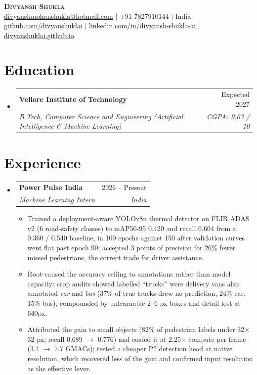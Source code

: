 \documentclass[letterpaper,11pt]{article}
\makeatletter
\newcommand{\graddate}{Expected 2027}
\newcommand{\introle}{Machine Learning Intern}
\newcommand{\intdates}{2026 -- Present}
\newcommand{\resumeItem}[1]{
  \item\small{
    {#1 \vspace{-2pt}}
  }
}
\newcommand{\resumeSubheading}[4]{
  \vspace{-2pt}\item
    \begin{tabular*}{0.97\textwidth}[t]{l@{\extracolsep{\fill}}r}
      \textbf{#1} & #2 \\
      \textit{\small#3} & \textit{\small #4} \\
    \end{tabular*}\vspace{-8pt}
}
\newcommand{\resumeSubHeadingListStart}{\begin{itemize}[leftmargin=0.15in, label={}, itemsep=0pt]}
\newcommand{\resumeSubHeadingListEnd}{\end{itemize}\vspace{-8pt}}
\newcommand{\resumeItemListStart}{\begin{itemize}[itemsep=-2.2pt]}
\newcommand{\resumeItemListEnd}{\end{itemize}\vspace{-6pt}}
\makeatother
\begin{document}
\begin{center}
    \textbf{\Huge \scshape Divyansh Shukla} \\ \vspace{2pt}
    \small
    \href{mailto:divyanshmohanshukla@hotmail.com}{\uline{divyanshmohanshukla@hotmail.com}} $|$
    +91 7827910144 $|$
    India \\ \vspace{1pt}
    \href{https://github.com/divyanshuklai}{\uline{github.com/divyanshuklai}} $|$
    \href{https://www.linkedin.com/in/divyansh-shukla-ai/}{\uline{linkedin.com/in/divyansh-shukla-ai}} $|$
    \href{https://divyanshuklai.github.io}{\uline{divyanshuklai.github.io}}
\end{center}

\section{Education}
  \resumeSubHeadingListStart
    \resumeSubheading
      {Vellore Institute of Technology}{\graddate}
      {B.Tech, Computer Science and Engineering (Artificial Intelligence \& Machine Learning)}{CGPA: 9.03 / 10}
  \resumeSubHeadingListEnd

\section{Experience}
  \resumeSubHeadingListStart
    \resumeSubheading
      {Power Pulse India}{\intdates}
      {\introle}{India}
      \resumeItemListStart
        \resumeItem{Trained a deployment-aware YOLOv8n thermal detector on FLIR ADAS v2 (6 road-safety classes) to mAP50-95 0.420 and recall 0.604 from a 0.360 / 0.540 baseline, in 100 epochs against 150 after validation curves went flat past epoch 90; accepted 3 points of precision for 26\% fewer missed pedestrians, the correct trade for driver assistance.}
        \resumeItem{Root-caused the accuracy ceiling to annotations rather than model capacity: crop audits showed labelled ``trucks'' were delivery vans also annotated \textit{car} and \textit{bus} (37\% of true trucks drew no prediction, 24\% car, 15\% bus), compounded by unlearnable 2--6 px boxes and detail lost at 640px.}
        \resumeItem{Attributed the gain to small objects (82\% of pedestrian labels under 32$\times$32 px; recall 0.689 $\rightarrow$ 0.776) and costed it at 2.25$\times$ compute per frame (3.4 $\rightarrow$ 7.7 GMACs); tested a cheaper P2 detection head at native resolution, which recovered less of the gain and confirmed input resolution as the effective lever.}
      \resumeItemListEnd
  \resumeSubHeadingListEnd
\end{document}
